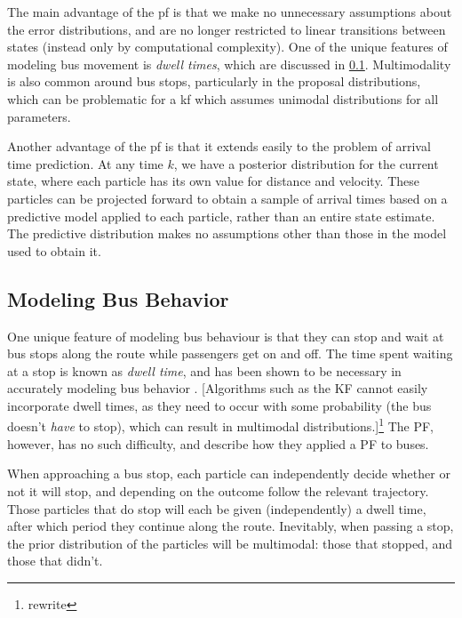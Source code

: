 \documentclass[12pt,a4paper]{article}
\begin{document}
The main advantage of the \gls{pf} is that we make no unnecessary 
assumptions about the error distributions, 
and are no longer restricted to linear transitions between states 
(instead only by computational complexity).
One of the unique features of modeling bus movement
is \emph{dwell times}, which are discussed in \cref{sec:busbehavior}.
Multimodality is also common around bus stops, particularly in the proposal distributions, 
which can be problematic for a \gls{kf} 
which assumes unimodal distributions for all parameters.


Another advantage of the \gls{pf} is that it extends easily to the problem of arrival time prediction.
At any time $k$, we have a posterior distribution for the current state,
where each particle has its own value for distance and velocity. 
These particles can be projected forward to obtain a sample of arrival times
based on a predictive model applied to each particle,
rather than an entire state estimate.
The predictive distribution makes no assumptions other than those in the model
used to obtain it.









\subsection{Modeling Bus Behavior}
\label{sec:busbehavior}


One unique feature of modeling bus behaviour is that 
they can stop and wait at bus stops along the route
while passengers get on and off.
The time spent waiting at a stop is known as \emph{dwell time},
and has been shown to be necessary in accurately modeling bus behavior \citep{cn}.
[Algorithms such as the KF cannot easily incorporate dwell times,
as they need to occur with some probability (the bus doesn't \emph{have} to stop),
which can result in multimodal distributions.]\footnote{rewrite}
The PF, however, has no such difficulty,
and \cite{hans-etal:2015} describe how they applied a PF to buses.


When approaching a bus stop,
each particle can independently decide whether or not it will stop,
and depending on the outcome follow the relevant trajectory.
Those particles that do stop will each be given (independently)
a dwell time, after which period they continue along the route.
Inevitably, when passing a stop, the prior distribution of the particles will be multimodal:
those that stopped, and those that didn't.
\end{document}
